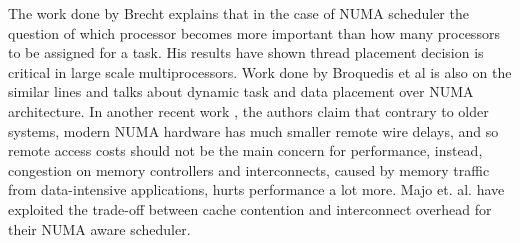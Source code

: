 The work done by Brecht \cite{Brecht:1993:IPA:1295480.1295481} explains that in the case of NUMA scheduler the question of which processor becomes more important than how many processors to be assigned for a task.
His results have shown thread placement decision is critical in large scale multiprocessors.
Work done by Broquedis et al \cite{numaScheduling} is also on the similar lines and talks about dynamic task and data placement over NUMA architecture.
In another recent work \cite{Dashti:2013:TMH:2490301.2451157}, the authors claim that contrary to older systems, modern NUMA hardware has much smaller remote wire delays, and so remote access costs should not be the main concern for performance, instead, congestion on memory controllers and interconnects, caused by memory traffic from data-intensive applications, hurts performance a lot more.
Majo et. al. \cite{Majo:2011:MMN:1993478.1993481} have exploited the trade-off between cache contention and interconnect overhead for their NUMA aware scheduler.

